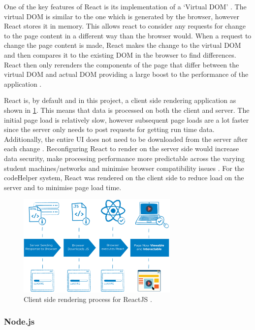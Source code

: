 One of the key features of React is its implementation of a `Virtual DOM' \cite{Aggarwal}. The virtual DOM is similar to the one which is generated by the browser, however React stores it in memory. This allows react to consider any requests for change to the page content in a different way than the browser would. When a request to change the page content is made, React makes the change to the virtual DOM and then compares it to the existing DOM in the browser to find differences. React then only rerenders the components of the page that differ between the virtual DOM and actual DOM providing a large boost to the performance of the application \cite{Aggarwal}.

React is, by default and in this project, a client side rendering application as shown in \ref{fig:csr}. This means that data is processed on both the client and server. The initial page load is relatively slow, however subsequent page loads are a lot faster since the server only needs to post requests for getting run time data. Additionally, the entire UI does not need to be downloaded from the server after each change \cite{csr}. Reconfiguring React to render on the server side would increase data security, make processing performance more predictable across the varying student machines/networks and minimise browser compatibility issues \cite{ssr}. For the codeHelper system, React was rendered on the client side to reduce load on the server and to minimise page load time.

\begin{figure}[H]
    \centering
    \includegraphics[width=0.7\textwidth]{7design/images/csr.png}
    \caption{Client side rendering process for ReactJS \cite{csr}.}
    \label{fig:csr}
\end{figure}

\subsubsection{Node.js}

